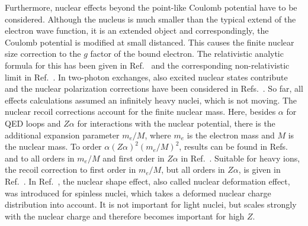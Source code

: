 Furthermore, nuclear effects beyond the point-like Coulomb potential have to be considered. Although the nucleus is much smaller than the typical extend of the electron wave function, it is an extended object and correspondingly, the Coulomb potential is modified at small distanced. This causes the finite nuclear size correction to the $g$ factor of the bound electron. The relativistic analytic formula for this has been given in Ref.~\cite{Glazov2002} and the corresponding non-relativistic limit in Ref.~\cite{karshenboim2000}. In two-photon exchanges, also excited nuclear states contribute and the nuclear polarization corrections have been considered in Refs.~\cite{Nefiodov,volotka2014}. 
So far, all effects calculations assumed an infinitely heavy nuclei, which is not moving. The nuclear recoil corrections account for the finite nuclear mass. Here, besides $\alpha$ for QED loops and $Z\alpha$ for interactions with the nuclear potential, there is the additional expansion parameter $m_e/M$, where $m_e$ is the electron mass and $M$ is the nuclear mass. To order $\alpha(Z\alpha)^2(m_e/M)^2$, results can be found in Refs.~\cite{eides2010} and to all orders in $m_e/M$ and first order in $Z\alpha$ in Ref.~\cite{pachucki2010}. Suitable for heavy ions, the recoil correction to first order in $m_e/M$, but all orders in $Z\alpha$, is given in Ref.~\cite{shabaev2001,Shabaev2002}.
In Ref.~\cite{jacek2012}, the nuclear shape effect, also called nuclear deformation effect, was introduced for spinless nuclei, which takes a deformed nuclear charge distribution into account. It is not important for light nuclei, but scales strongly with the nuclear charge and therefore becomes important for high $Z$. 


